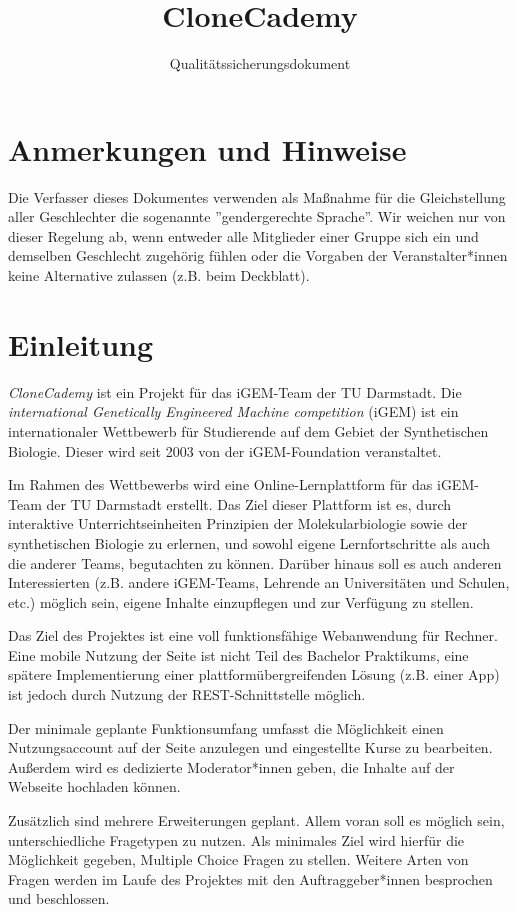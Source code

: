 \documentclass[accentcolor=tud0b,12pt,paper=a4]{tudreport}
\title{CloneCademy}
\subtitle{Qualitätssicherungsdokument}
\begin{document}
\maketitle
\tableofcontents

\chapter*{Anmerkungen und Hinweise}
Die Verfasser dieses Dokumentes verwenden als Maßnahme für die Gleichstellung aller Geschlechter die sogenannte ''gendergerechte Sprache''. Wir weichen nur von dieser Regelung ab, wenn entweder alle Mitglieder einer Gruppe sich ein und demselben Geschlecht zugehörig fühlen oder die Vorgaben der Veranstalter*innen keine Alternative zulassen (z.B. beim Deckblatt).

\chapter{Einleitung}

\emph{CloneCademy} ist ein Projekt für das iGEM-Team der TU Darmstadt. Die \emph{international Genetically Engineered Machine competition} (iGEM) ist ein internationaler Wettbewerb für Studierende auf dem Gebiet der Synthetischen Biologie.
Dieser wird seit 2003 von der iGEM-Foundation veranstaltet.

Im Rahmen des Wettbewerbs wird eine Online-Lernplattform für das iGEM-Team der TU Darmstadt erstellt. Das Ziel dieser Plattform ist es, durch interaktive Unterrichtseinheiten Prinzipien der Molekularbiologie sowie der synthetischen Biologie zu erlernen, und sowohl eigene Lernfortschritte als auch die anderer Teams, begutachten zu können. Darüber hinaus soll es auch anderen Interessierten (z.B. andere iGEM-Teams, Lehrende an Universitäten und Schulen, etc.) möglich sein, eigene Inhalte einzupflegen und zur Verfügung zu stellen.

Das Ziel des Projektes ist eine voll funktionsfähige Webanwendung für Rechner. Eine mobile Nutzung der Seite ist nicht Teil des Bachelor Praktikums, eine spätere Implementierung einer plattformübergreifenden Lösung (z.B. einer App) ist jedoch durch Nutzung der REST-Schnittstelle möglich.

Der minimale geplante Funktionsumfang umfasst die Möglichkeit einen Nutzungsaccount auf der Seite anzulegen und eingestellte Kurse zu bearbeiten. Außerdem wird es dedizierte Moderator*innen geben, die Inhalte auf der Webseite hochladen können.

Zusätzlich sind mehrere Erweiterungen geplant. Allem voran soll es möglich sein, unterschiedliche Fragetypen zu nutzen. Als minimales Ziel wird hierfür die Möglichkeit gegeben, Multiple Choice Fragen zu stellen. Weitere Arten von Fragen werden im Laufe des Projektes mit den Auftraggeber*innen besprochen und beschlossen.
\end{document}
